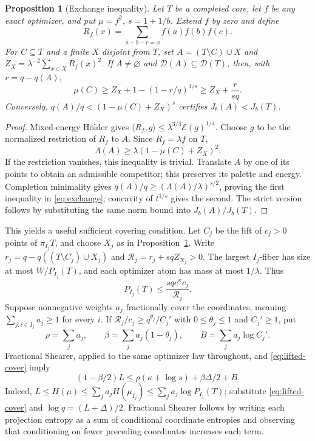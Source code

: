 \documentclass[11pt]{amsart}
\newtheorem{proposition}[theorem]{Proposition}
\theoremstyle{definition}
\theoremstyle{remark}
\newcommand{\Dp}{\mathcal{D}}
\begin{document}
\begin{proposition}[Exchange inequality]\label{prop:exchange}
Let $T$ be a completed core, let $f$ be any exact optimizer, and put $\mu=f^2$, $s=1+1/b$. Extend $f$ by zero and define
\[
R_f(x)=\sum_{a+b-c=x}f(a)f(b)f(c).
\]
For $C\subseteq T$ and a finite $X$ disjoint from $T$, set
$A=(T\setminus C)\cup X$ and $Z_X=\lambda^{-2}\sum_{x\in X}R_f(x)^2$.
If $A\ne\varnothing$ and $\Dp(A)\subseteq\Dp(T)$, then, with $r=q-q(A)$,
\begin{equation}\label{eq:exchange}
\mu(C)\ge Z_X+1-(1-r/q)^{1/s}\ge Z_X+\frac{r}{sq}.
\end{equation}
Conversely, $q(A)/q<(1-\mu(C)+Z_X)^s$ certifies $J_b(A)<J_b(T)$.
\end{proposition}
\begin{proof}
Mixed-energy H\"older gives
$\langle R_f,g\rangle\le\lambda^{3/4}\mathcal E(g)^{1/4}$.
Choose $g$ to be the normalized restriction of $R_f$ to $A$. Since $R_f=\lambda f$ on $T$,
\[
\Lambda(A)\ge\lambda(1-\mu(C)+Z_X)^2.
\]
If the restriction vanishes, this inequality is trivial. Translate $A$ by one of its points to obtain an admissible competitor; this preserves its palette and energy. Completion minimality gives $q(A)/q\ge(\Lambda(A)/\lambda)^{s/2}$, proving the first inequality in \eqref{eq:exchange}; concavity of $t^{1/s}$ gives the second. The strict version follows by substituting the same norm bound into $J_b(A)/J_b(T)$.
\end{proof}

This yields a useful sufficient covering condition. Let $C_j$ be the lift of $c_j>0$ points of $\pi_{I_j}T$, and choose $X_j$ as in Proposition~\ref{prop:exchange}. Write $r_j=q-q((T\setminus C_j)\cup X_j)$ and $\mathcal R_j=r_j+sqZ_{X_j}>0$. The largest $I_j$-fiber has size at most $W/P_{I_j}(T)$, and each optimizer atom has mass at most $1/\lambda$. Thus
\begin{equation}\label{eq:lifted-cover}
P_{I_j}(T)\le \frac{sq e^\kappa c_j}{\mathcal R_j}.
\end{equation}
Suppose nonnegative weights $a_j$ fractionally cover the coordinates, meaning $\sum_{j:i\in I_j}a_j\ge1$ for every $i$. If
$\mathcal R_j/c_j\ge q^{\theta_j}/C_j'$ with $0\le\theta_j\le1$ and $C_j'\ge1$, put
\[
\rho=\sum_j a_j,\qquad \beta=\sum_j a_j(1-\theta_j),
\qquad B=\sum_j a_j\log C_j'.
\]
Fractional Shearer, applied to the same optimizer law throughout, and \eqref{eq:lifted-cover} imply
\begin{equation}\label{eq:completion-criterion}
(1-\beta/2)L\le\rho(\kappa+\log s)+\beta\Delta/2+B.
\end{equation}
Indeed, $L\le H(\mu)\le\sum_j a_jH(\mu_{I_j})\le\sum_j a_j\log P_{I_j}(T)$; substitute \eqref{eq:lifted-cover} and $\log q=(L+\Delta)/2$. Fractional Shearer follows by writing each projection entropy as a sum of conditional coordinate entropies and observing that conditioning on fewer preceding coordinates increases each term.
\end{document}
